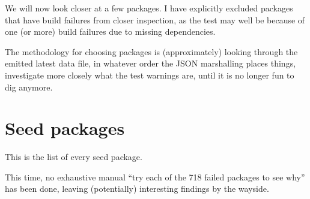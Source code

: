 \documentclass[a4paper]{paper}
\begin{document}
We will now look closer at a few packages. I have explicitly excluded
packages that have build failures from closer inspection, as the test
may well be because of one (or more) build failures due to missing
dependencies.

The methodology for choosing packages is (approximately) looking
through the emitted latest data file, in whatever order the JSON
marshalling places things, investigate more closely what the test
warnings are, until it is no longer fun to dig anymore.



\section{Seed packages}

This is the list of every seed package. 

This time, no exhaustive manual ``try each of the 718 failed packages
to see why'' has been done, leaving (potentially) interesting findings
by the wayside.


\end{document}
